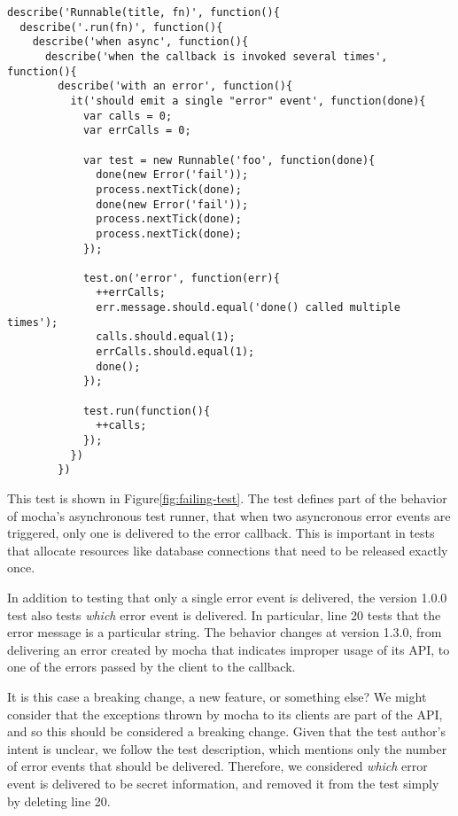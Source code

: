 \begin{figure*}
\begin{lstlisting}
describe('Runnable(title, fn)', function(){
  describe('.run(fn)', function(){
    describe('when async', function(){
      describe('when the callback is invoked several times', function(){
        describe('with an error', function(){
          it('should emit a single "error" event', function(done){
            var calls = 0;
            var errCalls = 0;

            var test = new Runnable('foo', function(done){
              done(new Error('fail'));
              process.nextTick(done);
              done(new Error('fail'));
              process.nextTick(done);
              process.nextTick(done);
            });

            test.on('error', function(err){
              ++errCalls;
              err.message.should.equal('done() called multiple times');
              calls.should.equal(1);
              errCalls.should.equal(1);
              done();
            });

            test.run(function(){
              ++calls;
            });
          })
        })
\end{lstlisting}
\caption{A failing mocha jsapi test}
\label{fig:failing-test}
\end{figure*}

This test is shown in Figure\~\ref{fig:failing-test}. The test defines
part of the behavior of mocha's asynchronous test runner, that when
two asyncronous error events are triggered, only one is delivered to
the error callback. This is important in tests that allocate resources
like database connections that need to be released exactly once.

In addition to testing that only a single error event is delivered,
the version 1.0.0 test also tests {\em which} error event is
delivered. In particular, line 20 tests that the error message is a
particular string. The behavior changes at version 1.3.0, from
delivering an error created by mocha that indicates improper usage of
its API, to one of the errors passed by the client to the callback.

It is this case a breaking change, a new feature, or something else?
We might consider that the exceptions thrown by mocha to its clients
are part of the API, and so this should be considered a breaking
change.  Given that the test author's intent is unclear, we follow the
test description, which mentions only the number of error events that
should be delivered. Therefore, we considered {\em which} error event
is delivered to be secret information, and removed it from the test
simply by deleting line 20.

